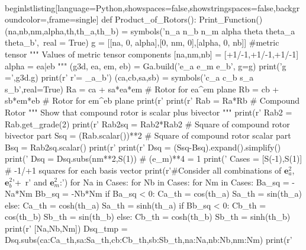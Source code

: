 \documentclass[10pt,fleqn]{report}
\begin{document}
\\begin{lstlisting}[language=Python,showspaces=false,showstringspaces=false,backgroundcolor=\color{gray},frame=single]
def Product_of_Rotors():
    Print_Function()
    (na,nb,nm,alpha,th,th_a,th_b) = symbols('n_a n_b n_m alpha theta theta_a theta_b',\
                                    real = True)
    g = [[na, 0, alpha],[0, nm, 0],[alpha, 0, nb]] #metric tensor
    """
    Values of metric tensor components
    [na,nm,nb] = [+1/-1,+1/-1,+1/-1]  alpha = ea|eb
    """
    (g3d, ea, em, eb) = Ga.build('e_a e_m e_b', g=g)
    print('g =',g3d.g)
    print(r'%
        r'\;\;\alpha = \bm{e}_{a}\cdot\bm{e}_{b}')
    (ca,cb,sa,sb) = symbols('c_a c_b s_a s_b',real=True)
    Ra = ca + sa*ea*em  # Rotor for ea^em plane
    Rb = cb + sb*em*eb  # Rotor for em^eb plane
    print(r'%
    print(r'%
    Rab = Ra*Rb  # Compound Rotor
    """
    Show that compound rotor is scalar plus bivector
    """
    print(r'%
    Rab2 = Rab.get_grade(2)
    print(r'%
    Rab2sq = Rab2*Rab2  # Square of compound rotor bivector part
    Ssq = (Rab.scalar())**2  # Square of compound rotor scalar part
    Bsq =  Rab2sq.scalar()
    print(r'%
    print(r'%
    Dsq = (Ssq-Bsq).expand().simplify()
    print('%
    Dsq = Dsq.subs(nm**2,S(1))  # (e_m)**4 = 1
    print('%
    Cases = [S(-1),S(1)]  # -1/+1 squares for each basis vector
    print(r'#Consider all combinations of $\bm{e}_{a}^{2}$, $\bm{e}_{b}^{2}$'+\
          r' and $\bm{e}_{m}^2$:')
    for Na in Cases:
        for Nb in Cases:
            for Nm in Cases:
                Ba_sq = -Na*Nm
                Bb_sq = -Nb*Nm
                if Ba_sq < 0:
                    Ca_th = cos(th_a)
                    Sa_th = sin(th_a)
                else:
                    Ca_th = cosh(th_a)
                    Sa_th = sinh(th_a)
                if Bb_sq < 0:
                    Cb_th = cos(th_b)
                    Sb_th = sin(th_b)
                else:
                    Cb_th = cosh(th_b)
                    Sb_th = sinh(th_b)
                print(r'%
                      [Na,Nb,Nm])
                Dsq_tmp = Dsq.subs({ca:Ca_th,sa:Sa_th,cb:Cb_th,sb:Sb_th,na:Na,nb:Nb,nm:Nm})
                print(r'%
\end{document}
